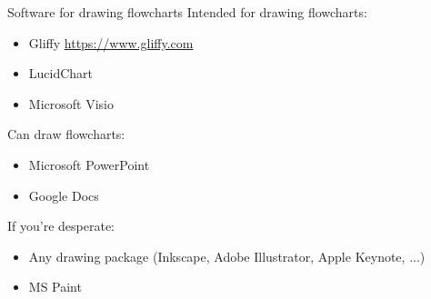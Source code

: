 \begin{frame}{Software for drawing flowcharts}
	\pause Intended for drawing flowcharts:
	\begin{itemize}
		\item Gliffy \url{https://www.gliffy.com}
		\item LucidChart
		\item Microsoft Visio
	\end{itemize}
	\pause Can draw flowcharts:
	\begin{itemize}
		\item Microsoft PowerPoint
		\item Google Docs
	\end{itemize}
	\pause If you're desperate:
	\begin{itemize}
		\item Any drawing package (Inkscape, Adobe Illustrator, Apple Keynote, ...)
		\item MS Paint
	\end{itemize}
\end{frame}

